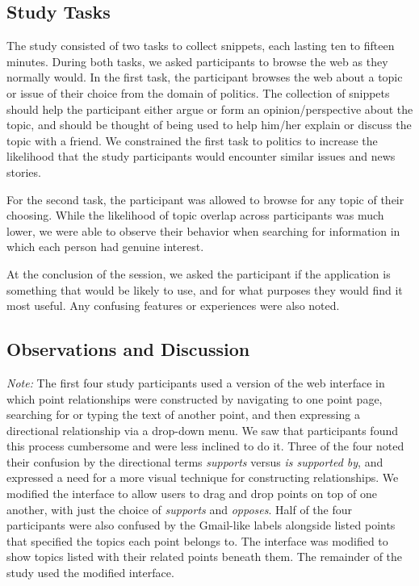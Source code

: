 \documentclass{chi2009}
\begin{document}
\subsection{Study Tasks}
The study consisted of two tasks to collect snippets, each lasting ten to fifteen minutes. During both tasks, we asked participants to browse the web as they normally would. In the first task, the participant browses the web about a topic or issue of their choice from the domain of politics. The collection of snippets should help the participant either argue or form an opinion/perspective about the topic, and should be thought of being used to help him/her explain or discuss the topic with a friend.  We constrained the first task to politics to increase the likelihood that the study participants would encounter similar issues and news stories.

For the second task, the participant was allowed to browse for any topic of their choosing. While the likelihood of topic overlap across participants was much lower, we were able to observe their behavior when searching for information in which each person had genuine interest.

At the conclusion of the session, we asked the participant if the application is something that would be likely to use, and for what purposes they would find it most useful. Any confusing features or experiences were also noted.

\subsection{Observations and Discussion}


{\it Note:} The first four study participants used a version of the web interface in which point relationships were constructed by navigating to one point page, searching for or typing the text of another point, and then expressing a directional relationship via a drop-down menu. We saw that participants found this process cumbersome and were less inclined to do it. Three of the four noted their confusion by the directional terms {\it supports} versus {\it is supported by}, and expressed a need for a more visual technique for constructing relationships. We modified the interface to allow users to drag and drop points on top of one another, with just the choice of {\it supports} and {\it opposes}. Half of the four participants were also confused by the Gmail-like labels alongside listed points that specified the topics each point belongs to.  The interface was modified to show topics listed with their related points beneath them. The remainder of the study used the modified interface. 
\end{document}
